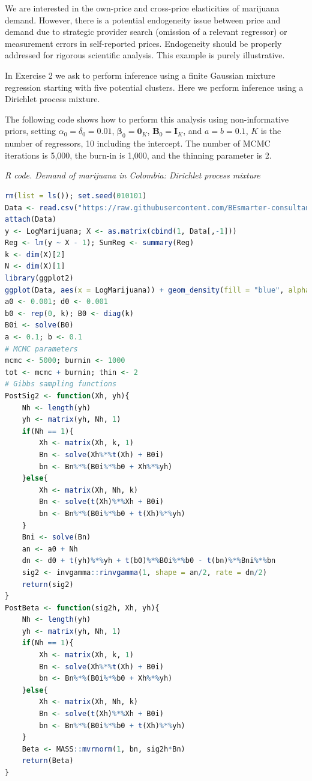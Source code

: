 We are interested in the own-price and cross-price elasticities of marijuana demand. However, there is a potential endogeneity issue between price and demand due to strategic provider search (omission of a relevant regressor) or measurement errors in self-reported prices. Endogeneity should be properly addressed for rigorous scientific analysis. This example is purely illustrative.

In Exercise 2 we ask to perform inference using a finite Gaussian mixture regression starting with five potential clusters. Here we perform inference using a Dirichlet process mixture.

The following code shows how to perform this analysis using non-informative priors, setting $\alpha_{0}=\delta_{0}=0.01$, $\boldsymbol{\beta}_{0}=\boldsymbol{0}_K$, $\boldsymbol{B}_{0}=\boldsymbol{I}_K$, and $a=b=0.1$, $K$ is the number of regressors, 10 including the intercept. The number of MCMC iterations is 5,000, the burn-in is 1,000, and the thinning parameter is 2.

\begin{tcolorbox}[enhanced,width=4.67in,center upper,
	fontupper=\large\bfseries,drop shadow southwest,sharp corners]
	\textit{R code. Demand of marijuana in Colombia: Dirichlet process mixture}
	\begin{VF}
		\begin{lstlisting}[language=R]
rm(list = ls()); set.seed(010101)
Data <- read.csv("https://raw.githubusercontent.com/BEsmarter-consultancy/BSTApp/refs/heads/master/DataApp/MarijuanaColombia.csv")
attach(Data)
y <- LogMarijuana; X <- as.matrix(cbind(1, Data[,-1]))
Reg <- lm(y ~ X - 1); SumReg <- summary(Reg)
k <- dim(X)[2]
N <- dim(X)[1]
library(ggplot2)
ggplot(Data, aes(x = LogMarijuana)) + geom_density(fill = "blue", alpha = 0.3) + labs(title = "Density Plot: Marijuana (log) monthly consumption in Colombia", x = "y", y = "Density") + theme_minimal()
a0 <- 0.001; d0 <- 0.001
b0 <- rep(0, k); B0 <- diag(k)
B0i <- solve(B0)
a <- 0.1; b <- 0.1
# MCMC parameters
mcmc <- 5000; burnin <- 1000
tot <- mcmc + burnin; thin <- 2
# Gibbs sampling functions
PostSig2 <- function(Xh, yh){
	Nh <- length(yh)
	yh <- matrix(yh, Nh, 1)
	if(Nh == 1){
		Xh <- matrix(Xh, k, 1)
		Bn <- solve(Xh%*%t(Xh) + B0i)
		bn <- Bn%*%(B0i%*%b0 + Xh%*%yh)
	}else{
		Xh <- matrix(Xh, Nh, k)
		Bn <- solve(t(Xh)%*%Xh + B0i)
		bn <- Bn%*%(B0i%*%b0 + t(Xh)%*%yh)
	}
	Bni <- solve(Bn)
	an <- a0 + Nh
	dn <- d0 + t(yh)%*%yh + t(b0)%*%B0i%*%b0 - t(bn)%*%Bni%*%bn 
	sig2 <- invgamma::rinvgamma(1, shape = an/2, rate = dn/2)
	return(sig2)
}
PostBeta <- function(sig2h, Xh, yh){
	Nh <- length(yh)
	yh <- matrix(yh, Nh, 1)
	if(Nh == 1){
		Xh <- matrix(Xh, k, 1)
		Bn <- solve(Xh%*%t(Xh) + B0i)
		bn <- Bn%*%(B0i%*%b0 + Xh%*%yh)
	}else{
		Xh <- matrix(Xh, Nh, k)
		Bn <- solve(t(Xh)%*%Xh + B0i)
		bn <- Bn%*%(B0i%*%b0 + t(Xh)%*%yh)
	}
	Beta <- MASS::mvrnorm(1, bn, sig2h*Bn)
	return(Beta)
}
\end{lstlisting}
	\end{VF}
\end{tcolorbox}
 
